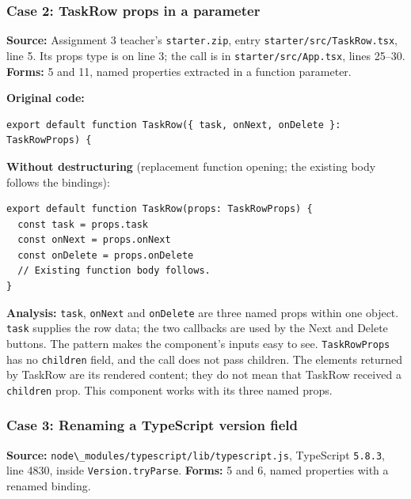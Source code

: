\documentclass[
  11pt,
]{article}
\newcommand{\passthrough}[1]{#1}
\begin{document}
\subsubsection{Case 2: TaskRow props in a
parameter}\label{case-2-taskrow-props-in-a-parameter}

\textbf{Source:} Assignment 3 teacher's
\passthrough{\lstinline!starter.zip!}, entry
\passthrough{\lstinline!starter/src/TaskRow.tsx!}, line 5. Its props
type is on line 3; the call is in
\passthrough{\lstinline!starter/src/App.tsx!}, lines 25--30.
\textbf{Forms:} 5 and 11, named properties extracted in a function
parameter.

\textbf{Original code:}

\begin{lstlisting}
export default function TaskRow({ task, onNext, onDelete }: TaskRowProps) {
\end{lstlisting}

\textbf{Without destructuring} (replacement function opening; the
existing body follows the bindings):

\begin{lstlisting}
export default function TaskRow(props: TaskRowProps) {
  const task = props.task
  const onNext = props.onNext
  const onDelete = props.onDelete
  // Existing function body follows.
}
\end{lstlisting}

\textbf{Analysis:} \passthrough{\lstinline!task!},
\passthrough{\lstinline!onNext!} and \passthrough{\lstinline!onDelete!}
are three named props within one object. \passthrough{\lstinline!task!}
supplies the row data; the two callbacks are used by the Next and Delete
buttons. The pattern makes the component's inputs easy to see.
\passthrough{\lstinline!TaskRowProps!} has no
\passthrough{\lstinline!children!} field, and the call does not pass
children. The elements returned by TaskRow are its rendered content;
they do not mean that TaskRow received a
\passthrough{\lstinline!children!} prop. This component works with its
three named props.

\subsubsection{Case 3: Renaming a TypeScript version
field}\label{case-3-renaming-a-typescript-version-field}

\textbf{Source:}
\passthrough{\lstinline!node\_modules/typescript/lib/typescript.js!},
TypeScript \passthrough{\lstinline!5.8.3!}, line 4830, inside
\passthrough{\lstinline!Version.tryParse!}. \textbf{Forms:} 5 and 6,
named properties with a renamed binding.
\end{document}
